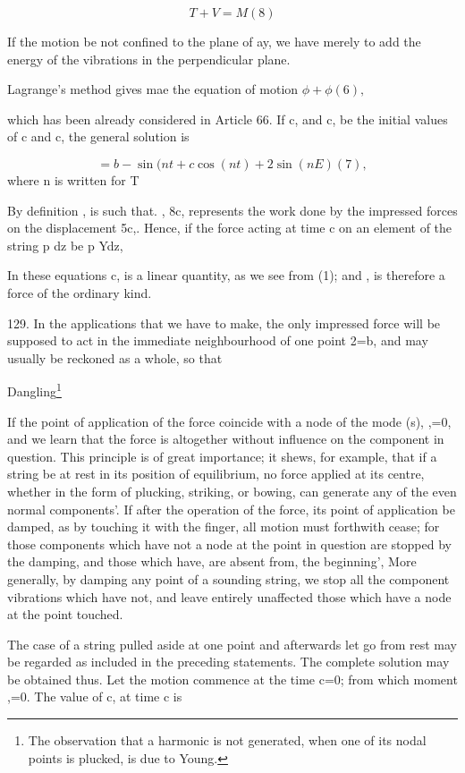 \[T+V=  M (8)\]

If the motion be not confined to the plane of ay, we have merely to add the
energy of the vibrations in the perpendicular plane.

Lagrange's method gives mae the equation of motion \(\phi +\phi (6),\)

which has been already considered in Article 66. If c, and c, be the initial
values of c and c, the general solution is

\[=b- \sin(nt + c \cos(nt) +2 \sin(n E) (7),\]
where n is written for T

By definition , is such that. , 8c, represents the work done by the impressed
forces on the displacement 5c,. Hence, if the force acting at time c on an
element of the string p dz be p Ydz,

In these equations c, is a linear quantity, as we see from (1); and , is
therefore a force of the ordinary kind.

129. In the applications that we have to make, the only impressed force will be
supposed to act in the immediate neighbourhood of one point 2=b, and may
usually be reckoned as a whole, so that

Dangling\footnote{ The observation that a harmonic is not generated, when one of its nodal
points is plucked, is due to Young.}

If the point of application of the force coincide with a node of the mode (s),
,=0, and we learn that the force is altogether without influence on the
component in question. This principle is of great importance; it shews, for
example, that if a string be at rest in its position of equilibrium, no force
applied at its centre, whether in the form of plucking, striking, or bowing,
can generate any of the even normal components'. If after the operation of the
force, its point of application be damped, as by touching it with the finger,
all motion must forthwith cease; for those components which have not a node at
the point in question are stopped by the damping, and those which have, are
absent from, the beginning', More generally, by damping any point of a sounding
string, we stop all the component vibrations which have not, and leave entirely
unaffected those which have a node at the point touched.


The case of a string pulled aside at one point and afterwards let go from rest
may be regarded as included in the preceding statements. The complete solution
may be obtained thus. Let the motion commence at the time c=0; from which
moment ,=0. The value of c, at time c is

